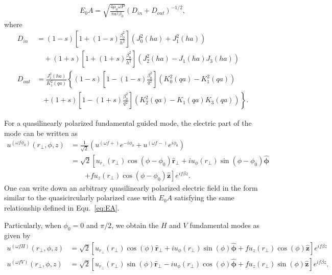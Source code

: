 \documentclass[preprint,aps,pra,onecolumn]{revtex4-1} %
\begin{document}
\begin{align}\label{eq:EA}
E_0 A=\sqrt{\frac{4\mu_0\omega P}{\pi a^2 \beta_0}}\left(D_{in} + D_{out} \right)^{-1/2},
\end{align}
where
\begin{align}
D_{in} &= (1-s)\left[ 1+(1-s)\frac{\beta_0^2}{h^2}\right] \left(J_0^2(ha) + J_1^2(ha) \right) \nonumber\\
&\quad + (1+s)\left[ 1+(1+s)\frac{\beta_0^2}{h^2}\right] \left(J_2^2(ha)- J_1(ha)J_3(ha) \right)\\
D_{out} &= \frac{J_1^2(ha)}{K_1^2(qa)}\left\{ (1-s)\left[ 1-(1-s)\frac{\beta_0^2}{q^2}\right] \left(K_0^2(qa) - K_1^2(qa) \right)\right. \nonumber\\
&\quad \left. + (1\!+\! s)\left[ 1\!-\! (1\!+\! s)\frac{\beta_0^2}{q^2}\right] \left(K_2^2(qa)\! -\! K_1(qa)K_3(qa) \right) \right\}.
\end{align}



For a quasilinearly polarized fundamental guided mode, the electric part of the mode can be written as 
\begin{align}
u^{(\omega f \phi_0)}(r\!_\perp,\phi,z) &= \frac{1}{\sqrt{2}} \left(u^{(\omega f +)}e^{-i\phi_0} +u^{(\omega f -)}e^{i\phi_0} \right)\\
&= \sqrt{2}\left[u_{r\!_\perp}(r\!_\perp)\cos(\phi-\phi_0)\hat{\mathbf{r}}\!_\perp + iu_\phi(r\!_\perp)\sin(\phi-\phi_0)\hat{\boldsymbol{\phi}} \right. \nonumber \\
&\quad\quad \left. + fu_z(r\!_\perp)\cos(\phi-\phi_0)\hat{\mathbf{z}} \right]e^{if\beta z}.
\end{align}
One can write down an arbitrary quasilinearly polarized electric field in the form similar to the quasicircularly polarized case with $E_0A$ satisfying the same relationship defined in Equ.~\eqref{eq:EA}. 

Particularly, when $\phi_0=0$ and $\pi/2$, we obtain the $H$ and $V$ fundamental modes as given by
\begin{align}
u^{(\omega f H)}(r\!_\perp,\phi,z)
&= \sqrt{2}\left[u_{r\!_\perp}(r\!_\perp)\cos(\phi)\hat{\mathbf{r}}\!_\perp + iu_\phi(r\!_\perp)\sin(\phi)\hat{\boldsymbol{\phi}} + fu_z(r\!_\perp)\cos(\phi)\hat{\mathbf{z}} \right]e^{if\beta z}\\
u^{(\omega f V)}(r\!_\perp,\phi,z)
&= \sqrt{2}\left[u_{r\!_\perp}(r\!_\perp)\sin(\phi)\hat{\mathbf{r}}\!_\perp - iu_\phi(r\!_\perp)\cos(\phi)\hat{\boldsymbol{\phi}}  + fu_z(r\!_\perp)\sin(\phi)\hat{\mathbf{z}} \right]e^{if\beta z}.
\end{align}
\end{document}

